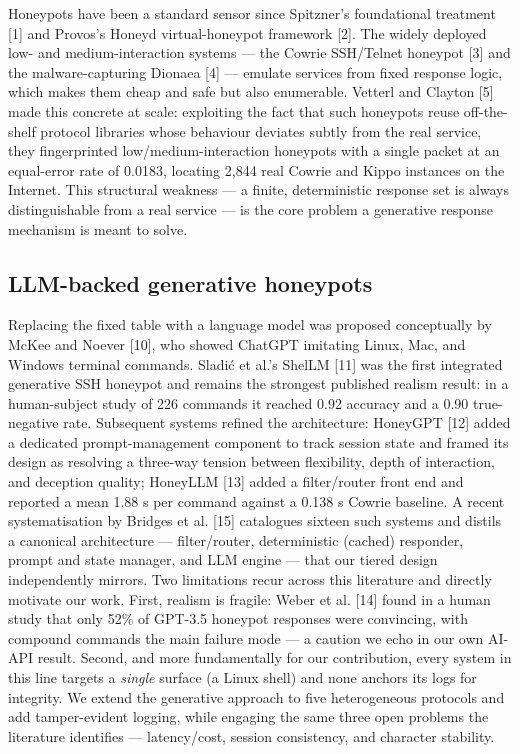 \documentclass[conference]{IEEEtran}
\begin{document}
Honeypots have been a standard sensor since Spitzner's foundational treatment [1] and Provos's Honeyd virtual-honeypot framework [2]. The widely deployed low- and medium-interaction systems --- the Cowrie SSH/Telnet honeypot [3] and the malware-capturing Dionaea [4] --- emulate services from fixed response logic, which makes them cheap and safe but also enumerable. Vetterl and Clayton [5] made this concrete at scale: exploiting the fact that such honeypots reuse off-the-shelf protocol libraries whose behaviour deviates subtly from the real service, they fingerprinted low/medium-interaction honeypots with a single packet at an equal-error rate of 0.0183, locating 2,844 real Cowrie and Kippo instances on the Internet. This structural weakness --- a finite, deterministic response set is always distinguishable from a real service --- is the core problem a generative response mechanism is meant to solve.

\subsection{LLM-backed generative honeypots}

Replacing the fixed table with a language model was proposed conceptually by McKee and Noever [10], who showed ChatGPT imitating Linux, Mac, and Windows terminal commands. Sladić et al.'s ShelLM [11] was the first integrated generative SSH honeypot and remains the strongest published realism result: in a human-subject study of 226 commands it reached 0.92 accuracy and a 0.90 true-negative rate. Subsequent systems refined the architecture: HoneyGPT [12] added a dedicated prompt-management component to track session state and framed its design as resolving a three-way tension between flexibility, depth of interaction, and deception quality; HoneyLLM [13] added a filter/router front end and reported a mean 1.88 s per command against a 0.138 s Cowrie baseline. A recent systematisation by Bridges et al. [15] catalogues sixteen such systems and distils a canonical architecture --- filter/router, deterministic (cached) responder, prompt and state manager, and LLM engine --- that our tiered design independently mirrors. Two limitations recur across this literature and directly motivate our work. First, realism is fragile: Weber et al. [14] found in a human study that only 52\% of GPT-3.5 honeypot responses were convincing, with compound commands the main failure mode --- a caution we echo in our own AI-API result. Second, and more fundamentally for our contribution, every system in this line targets a \emph{single} surface (a Linux shell) and none anchors its logs for integrity. We extend the generative approach to five heterogeneous protocols and add tamper-evident logging, while engaging the same three open problems the literature identifies --- latency/cost, session consistency, and character stability.
\end{document}
